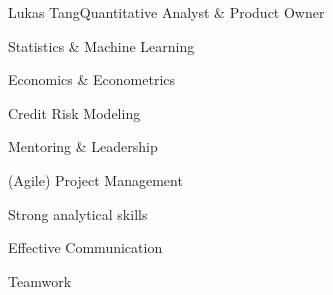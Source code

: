 \documentclass{article}
\begin{document}
\begin{cv}[avatar]{Lukas Tang}{Quantitative Analyst \& Product Owner}
\cvseparator
\begin{cvitem}
    Statistics \& Machine Learning
\end{cvitem}

\cvseparator
\begin{cvitem}
    Economics \& Econometrics
\end{cvitem}

\cvseparator
\begin{cvitem}
    Credit Risk Modeling
\end{cvitem}

\cvseparator
\begin{cvitem}
    Mentoring \& Leadership
\end{cvitem}

\cvseparator
\begin{cvitem}
    (Agile) Project Management
\end{cvitem}

\cvseparator
\begin{cvitem}
    Strong analytical skills
\end{cvitem}

\cvseparator
\begin{cvitem}
    Effective Communication
\end{cvitem}

\cvseparator
\begin{cvitem}
    Teamwork
\end{cvitem}




\end{cv}
\end{document}
